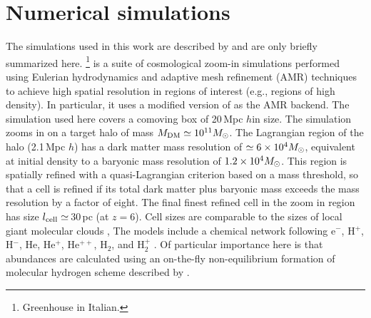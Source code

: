 \IfFileExists{emulateapjlegacy.cls}{\documentclass[iop]{emulateapjlegacy}}{\documentclass[iop]{emulateapj}}
\newcommand{\AP}[1]{({\bf \color{apcolor} AP: #1})}
\newcommand{\MM}[1]{({\bf \color{mmcolor} MM: #1})}
\begin{document}
\section{Numerical simulations}\label{sec:sim}
The simulations used in this work are described by \citealt{Pallottini17a, Pallottini17b} and are only briefly summarized here.
%
\footnote{Greenhouse in Italian.} is a suite of cosmological zoom-in simulations performed using Eulerian hydrodynamics and adaptive mesh refinement (AMR) techniques to achieve high spatial resolution in regions of interest (e.g., regions of high density).
%
In particular, it uses a modified version of 
\citep{Teyssier02a} as the AMR backend. The simulation used here
covers a comoving box of 20\,Mpc $h$\pmOne in size. The simulation
zooms in on a target halo of mass $M_{\rm DM}\simeq10^{11} \mbox{$M_{\odot}$}$. The Lagrangian
region of the halo (2.1\,Mpc $h$\pmOne) has a dark matter
mass resolution of $\simeq 6\times 10^4 \mbox{$M_{\odot}$}$, 
     equivalent at initial density to a baryonic mass resolution of $1.2
     \times 10^4 \mbox{$M_{\odot}$}$.  This 
region is spatially refined with a quasi-Lagrangian criterion based on
a mass threshold, so that a cell is refined if its total dark matter
plus baryonic mass exceeds the mass resolution by a factor of
eight. The final finest refined cell in the zoom in region has size
$l_{\rm cell}\simeq$\,30\,pc (at $z = 6$). 
     Cell sizes are comparable to the sizes of local giant molecular clouds \citep[e.g.,][]{Sanders85a, Federrath13a, Goodman14a},
The models include a chemical network 
following e$^{-}$, H$^+$, H$^-$, He, He$^+$, He$^{++}$, H$_2$, and
H$_2^+$ \citep{Grassi14a,Bovino16a}. Of particular importance here is
that abundances are calculated using an on-the-fly non-equilibrium
formation of molecular hydrogen scheme  
    described by \citet{Pallottini17a}.
\end{document}
